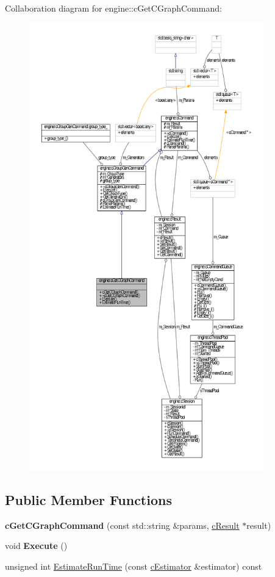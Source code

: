 \-Collaboration diagram for engine\-:\-:c\-Get\-C\-Graph\-Command\-:\nopagebreak
\begin{figure}[H]
\begin{center}
\leavevmode
\includegraphics[height=550pt]{classengine_1_1cGetCGraphCommand__coll__graph}
\end{center}
\end{figure}
\subsection*{\-Public \-Member \-Functions}
\begin{DoxyCompactItemize}
\item 
\hypertarget{classengine_1_1cGetCGraphCommand_aaf87f44392cf780bd4308e8d6dc3139d}{{\bfseries c\-Get\-C\-Graph\-Command} (const std\-::string \&params, \hyperlink{classengine_1_1cResult}{c\-Result} $\ast$result)}\label{classengine_1_1cGetCGraphCommand_aaf87f44392cf780bd4308e8d6dc3139d}

\item 
\hypertarget{classengine_1_1cGetCGraphCommand_a94b83bc4b3103138411ec5bf1ccca84c}{void {\bfseries \-Execute} ()}\label{classengine_1_1cGetCGraphCommand_a94b83bc4b3103138411ec5bf1ccca84c}

\item 
unsigned int \hyperlink{classengine_1_1cGetCGraphCommand_a0a3d07c4f82227b7f0ffbcf01f7fcec2}{\-Estimate\-Run\-Time} (const \hyperlink{classengine_1_1cEstimator}{c\-Estimator} \&estimator) const 
\end{DoxyCompactItemize}


